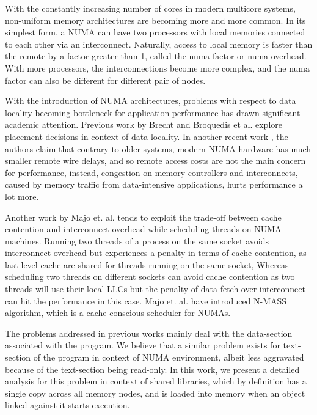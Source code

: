 
With the constantly increasing number of cores in modern multicore systems, non-uniform memory architectures
are becoming more and more common. In its simplest form, a NUMA can have two processors with local memories connected
to each other via an interconnect. Naturally, access to local memory is faster than the remote by a factor greater than 1,
called the numa-factor or numa-overhead. With more processors, the interconnections become more complex, and the numa factor
can also be different for different pair of nodes.

With the introduction of NUMA architectures, problems with respect to data locality becoming bottleneck for application performance
has drawn significant academic attention. Previous work by Brecht\cite{Brecht:1993:IPA:1295480.1295481} and 
Broquedis et al.\cite{numaScheduling} explore placement decisions in context of data locality.
In another recent work \cite{Dashti:2013:TMH:2490301.2451157}, the authors claim that contrary to older systems,
modern NUMA hardware has much smaller remote wire delays, and so remote access costs are not the main 
concern for performance, instead, congestion on memory controllers and interconnects, caused by memory traffic 
from data-intensive applications, hurts performance a lot more.

Another work by Majo et. al. \cite{Majo:2011:MMN:1993478.1993481} tends to exploit the trade-off between cache contention
and interconnect overhead while scheduling threads on NUMA machines. Running two threads of a process on the same socket
avoids interconnect overhead but experiences a penalty in terms of cache contention, as last level cache are shared for
threads running on the same socket, Whereas scheduling two threads on different sockets can avoid cache contention
as two threads will use their local LLCs but the penalty of data fetch over interconnect can hit the performance in this case.
Majo et. al. \cite{Majo:2011:MMN:1993478.1993481} have introduced N-MASS algorithm, which is a cache conscious scheduler for NUMAs.

The problems addressed in previous works mainly deal with the data-section associated with the program. We believe that
a similar problem exists for text-section of the program in context of NUMA environment, albeit less aggravated
because of the text-section being read-only. In this work, we present a detailed analysis for this problem in context of
shared libraries, which by definition has a single copy across all memory nodes, and is loaded into memory when an object
linked against it starts execution.

